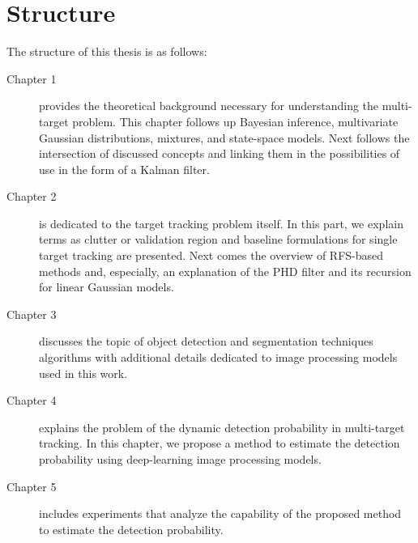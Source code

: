 \section{Structure}
The structure of this thesis is as follows:
\begin{description}
  \item[Chapter 1] provides the theoretical background necessary for understanding the multi-target problem.
  This chapter follows up Bayesian inference, multivariate Gaussian distributions, mixtures, and state-space models.
  Next follows the intersection of discussed concepts and linking them in the possibilities of use in the form of a
  Kalman filter.

  \item[Chapter 2] is dedicated to the target tracking problem itself. In this part, we explain terms as clutter or
  validation region and baseline formulations for single target tracking are presented. Next comes the overview of
  RFS-based
  methods and, especially, an explanation of the PHD filter and its recursion for linear Gaussian models.

  \item[Chapter 3] discusses the topic of object detection and segmentation techniques algorithms with additional
  details
  dedicated to image processing models used in this work.

  \item[Chapter 4] explains the problem of the dynamic detection probability in multi-target tracking. In this
  chapter, we
  propose a method to estimate the detection probability using deep-learning image processing models.
  \item[Chapter 5] includes experiments that analyze the capability of the proposed method to estimate the detection
  probability.
\end{description}

